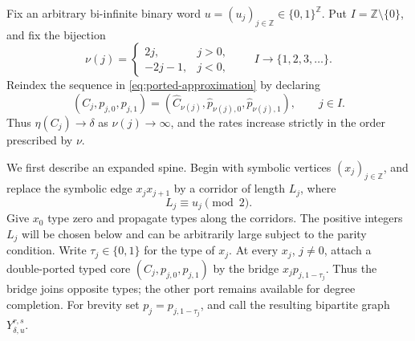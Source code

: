 \documentclass[11pt]{amsart}
\theoremstyle{plain}
\theoremstyle{definition}
\theoremstyle{remark}
\newcommand{\ZZ}{\mathbb Z}
\begin{document}
Fix an arbitrary bi-infinite binary word
\(u=(u_j)_{j\in\ZZ}\in\{0,1\}^{\ZZ}\).  Put
\(I=\ZZ\setminus\{0\}\), and fix the bijection
\begin{equation}\label{eq:sparse-index-enumeration}
  \nu(j)=
  \begin{cases}
    2j,&j>0,\\
    -2j-1,&j<0,
  \end{cases}
  \qquad I\longrightarrow\{1,2,3,\ldots\}.
\end{equation}
Reindex the sequence in \eqref{eq:ported-approximation} by declaring
\begin{equation}\label{eq:sparse-core-reindexing}
  (C_j,p_{j,0},p_{j,1})
  =(\widehat C_{\nu(j)},\widehat p_{\nu(j),0},
    \widehat p_{\nu(j),1}),
  \qquad j\in I.
\end{equation}
Thus \(\eta(C_j)\to\delta\) as \(\nu(j)\to\infty\), and the rates increase
strictly in the order prescribed by \(\nu\).

We first describe an expanded spine.  Begin with symbolic vertices
\((x_j)_{j\in\ZZ}\), and
replace the symbolic edge \(x_jx_{j+1}\) by a corridor of length \(L_j\),
where
\begin{equation}\label{eq:sparse-corridor-parity}
  L_j\equiv u_j\pmod 2.
\end{equation}
Give \(x_0\) type zero and propagate types along the corridors.  The
positive integers \(L_j\) will be chosen below and can be arbitrarily large
subject to the parity condition.  Write \(\tau_j\in\{0,1\}\) for the type
of \(x_j\).  At every \(x_j\), \(j\neq0\), attach a double-ported typed core
\((C_j,p_{j,0},p_{j,1})\) by the bridge
\(x_jp_{j,1-\tau_j}\).  Thus the bridge joins opposite types; the other
port remains available for degree completion.  For brevity set
\(p_j=p_{j,1-\tau_j}\), and call the resulting bipartite graph
\(Y_{\delta,u}^{r,s}\).
\end{document}
